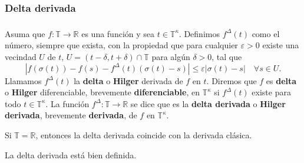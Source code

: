 \subsubsection{Delta derivada}

\begin{frame}
\frametitle{\subsubsecname}

\begin{definition}\label{def:delta}
Asuma que $f\colon\mathds{T}\rightarrow\mathds{R}$ es una función y sea $t\in\mathds{T}^{\kappa}$. Definimos $f^{\Delta}\left(t\right)$ como el número, siempre que exista, con la propiedad que para cualquier $\varepsilon>0$ existe una vecindad $U$ de $t$, $U=\left(t-\delta,t+\delta\right)\cap\mathds{T}$ para algún $\delta>0$, tal que
\[ \left|f\left(\sigma\left(t\right)\right)-f\left(s\right)-f^{\Delta}\left(t\right)\left(\sigma\left(t\right)-s\right)\right|\leq\varepsilon|\sigma\left(t\right)-s|\quad\forall s\in U. \]
Llamamos $f^{\Delta}\left(t\right)$ la \textbf{delta} o \textbf{Hilger} derivada de $f$ en $t$. Diremos que $f$ es \textbf{delta} o \textbf{Hilger} diferenciable, brevemente \textbf{diferenciable}, en $\mathds{T}^{\kappa}$ si $f^{\Delta}\left(t\right)$ existe para todo $t\in\mathds{T}^{\kappa}$. La función $f^{\Delta}\colon\mathds{T}\rightarrow\mathds{R}$ se dice que es la \textbf{delta derivada} o \textbf{Hilger derivada}, brevemente \textbf{derivada}, de $f$ en $\mathds{T}^{\kappa}$.
\end{definition}

\begin{remark}
Si $\mathds{T}=\mathds{R}$, entonces la delta derivada coincide con la derivada clásica.
\end{remark}

\begin{theorem}
La delta derivada está bien definida.
\end{theorem}
\end{frame}

